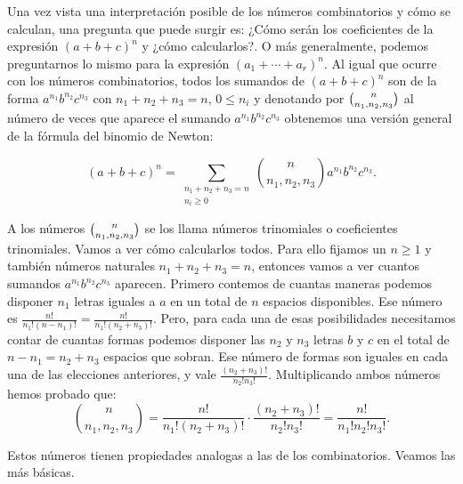 \documentclass{article}
\theoremstyle{plain}
\theoremstyle{definition}
\begin{document}
Una vez vista una interpretación posible de los números combinatorios y cómo se calculan, una pregunta 
que puede surgir es: ¿Cómo serán los coeficientes de la expresión $(a+b+c)^n$ y ¿cómo calcularlos?. O más
generalmente, podemos preguntarnos lo mismo para la expresión $(a_1 + \cdots + a_r)^n$. Al igual que ocurre 
con los números combinatorios, todos los sumandos de $(a+b+c)^n$ son de la forma 
$a^{n_1}b^{n_2}c^{n_3}$ con $n_1 + n_2 + n_3 = n$, $0 \le n_i$ y denotando por $\tbinom{n}{n_1, n_2, n_3}$ al 
número de veces que aparece el sumando $a^{n_1}b^{n_2}c^{n_3}$ obtenemos una versión general de la fórmula del 
binomio de Newton:

\[
(a+b+c)^n = 
\sum_{\substack{
    n_1+n_2+n_3=n \\
    n_i \ge 0
}}
\binom{n}{n_1, n_2, n_3}
a^{n_1}b^{n_2}c^{n_3}.
\]

A los números $\tbinom{n}{n_1, n_2, n_3}$ se los llama números trinomiales o coeficientes trinomiales.
Vamos a ver cómo calcularlos todos. Para ello fijamos un $n\ge 1$ y también números naturales 
$n_1 + n_2 + n_3 = n$, entonces vamos a ver cuantos sumandos $a^{n_1}b^{n_2}c^{n_3}$ aparecen.
Primero contemos de cuantas maneras podemos disponer $n_1$ letras iguales a $a$ en un total de
$n$ espacios disponibles. Ese número es $\displaystyle\frac{n!}{n_1!(n - n_1)!} = \frac{n!}{n_1!(n_2 + n_3)!}$.
Pero, para cada una de esas posibilidades necesitamos contar de cuantas formas podemos disponer las $n_2$ y 
$n_3$ letras $b$ y $c$ en el total de $n - n_1 = n_2 + n_3$ espacios que sobran. Ese número de formas
son iguales en cada una de las elecciones anteriores, y vale $\displaystyle\frac{(n_2 + n_3)!}{n_2!n_3!}$.
Multiplicando ambos números hemos probado que:
\[
\binom{n}{n_1, n_2, n_3} = \frac{n!}{n_1!(n_2 + n_3)!}\cdot\frac{(n_2 + n_3)!}{n_2!n_3!} = \frac{n!}{n_1!n_2!n_3!}.
\]

Estos números tienen propiedades analogas a las de los combinatorios. Veamos las más básicas.
\end{document}
